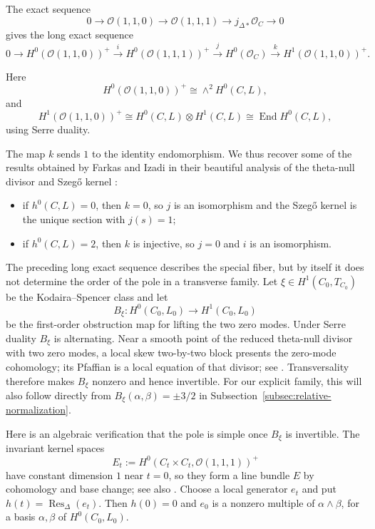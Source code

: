 \documentclass[10pt,a4paper]{amsart}
\newcommand{\OO}{\mathcal O}
\begin{document}
The exact sequence
\begin{equation}
    0\to \OO(1,1,0)\to \OO(1,1,1)\to {j_{\Delta*}\OO_C}\to 0
\end{equation}
gives the long exact sequence
\begin{equation}
0\to {H^0(\OO(1,1,0))^+}\xrightarrow{i}
{H^0(\OO(1,1,1))^+}\xrightarrow{j}
H^0(\OO_C)\xrightarrow{k}
{H^1(\OO(1,1,0))^+}.
\end{equation}

Here
\[
{H^0(\OO(1,1,0))^+} \cong \wedge^2 H^0(C,L),
\]
and
\[
{H^1(\OO(1,1,0))^+} \cong H^0(C,L)\otimes H^1(C,L)
\cong \operatorname{End}H^0(C,L),
\]
using Serre duality.

The map $k$ sends $1$ to the identity endomorphism. We thus recover some of the results obtained by
Farkas and Izadi in their beautiful analysis of the theta-null divisor and Szeg\H{o} kernel \cite{FI}:
\begin{itemize}[leftmargin=2em]
\item if $h^0(C,L)=0$, then $k=0$, so $j$ is an isomorphism and the Szeg\H{o} kernel is the unique section with $j(s)=1$;
\item if $h^0(C,L)=2$, then $k$ is injective, so $j=0$ and $i$ is an isomorphism.
\end{itemize}

The preceding long exact sequence describes the special fiber, but by
itself it does not determine the order of the pole in a transverse
family.  Let $\xi{\in H^1(C_0,T_{C_0})}$ be the
Kodaira--Spencer class and let
\[
B_\xi:H^0(C_0,L_0)\longrightarrow H^1(C_0,L_0)
\]
be the first-order obstruction map for lifting the two zero modes.  {Under Serre duality $B_\xi$ is alternating. Near a smooth point
of the reduced theta-null divisor with two zero modes, a local skew
two-by-two block presents the zero-mode cohomology; its Pfaffian is a
local equation of that divisor; {see \cite[Section~4.4]{FKP}}. Transversality therefore makes
$B_\xi$ nonzero and hence invertible. For our explicit family, this
will also follow directly from
$B_\xi(\alpha,\beta)=\pm3/2$ in
Subsection~\ref{subsec:relative-normalization}.}

\begingroup
Here is an algebraic verification that the pole is simple once $B_\xi$
is invertible. The invariant kernel spaces
\[
E_t:=H^0(C_t\times C_t,\OO(1,1,1))^+
\]
have constant dimension $1$ near $t=0$, so they form a line bundle $E$
by cohomology and base change; see also \cite[Proposition~1.2]{FI}.
Choose a local generator $e_t$ and put
$h(t)=\operatorname{Res}_\Delta(e_t)$. Then $h(0)=0$ and
$e_0$ is a nonzero multiple of $\alpha\wedge\beta$, for a basis
$\alpha,\beta$ of $H^0(C_0,L_0)$.
\end{document}
